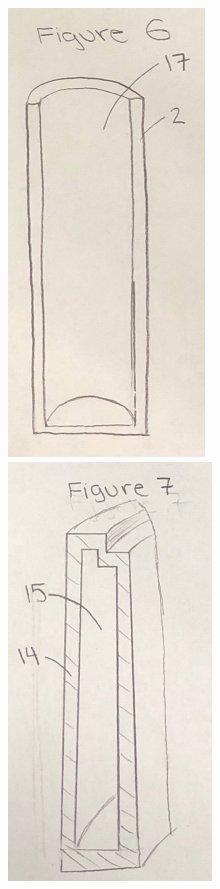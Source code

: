 \documentclass[english]{uspatent}
\begin{document}
\begin{center}
\includegraphics{Figure6.png}\\
\includegraphics{Figure7.png}
\end{center}
\nocite{*}


\end{document}
